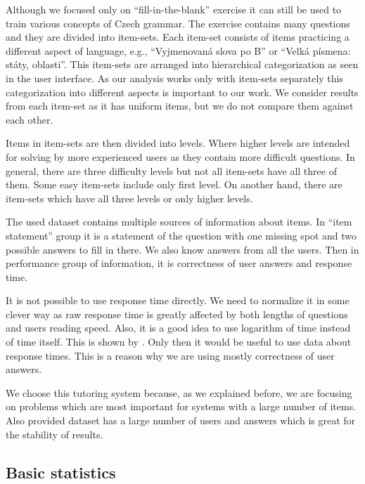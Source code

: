 \documentclass[
  digital, %
  table,   %
  nolof,     %
  nolot,     %
  nocover,
  color,
  final, %
]{fithesis3}
\begin{document}
Although we focused only on ``fill-in-the-blank'' exercise it can still be used to train various concepts of Czech grammar. The exercise contains many questions and they are divided into item-sets. Each item-set consists of items practicing a different aspect of language, e.g., ``Vyjmenovaná slova po B'' or ``Velká písmena: státy, oblasti''. This item-sets are arranged into hierarchical categorization as seen in the user interface. As our analysis works only with item-sets separately this categorization into different aspects is important to our work. We consider results from each item-set as it has uniform items, but we do not compare them against each other.

Items in item-sets are then divided into levels. Where higher levels are intended for solving by more experienced users as they contain more difficult questions. In general, there are three difficulty levels but not all item-sets have all three of them. Some easy item-sets include only first level. On another hand, there are item-sets which have all three levels or only higher levels.


The used dataset contains multiple sources of information about items. In ``item statement'' group it is a statement of the question with one missing spot and two possible answers to fill in there. We also know answers from all the users. Then in performance group of information, it is correctness of user answers and response time.

It is not possible to use response time directly. We need to normalize it in some clever way as raw response time is greatly affected by both lengths of questions and users reading speed. Also, it is a good idea to use logarithm of time instead of time itself. This is shown by \citeauthor{niznan2014using}\cite{niznan2014using}. Only then it would be useful to use data about response times. This is a reason why we are using mostly correctness of user answers.


We choose this tutoring system because, as we explained before, we are focusing on problems which are most important for systems with a large number of items. Also provided dataset has a large number of users and answers which is great for the stability of results.


\subsection{Basic statistics}\label{basic-statistics}
\end{document}
